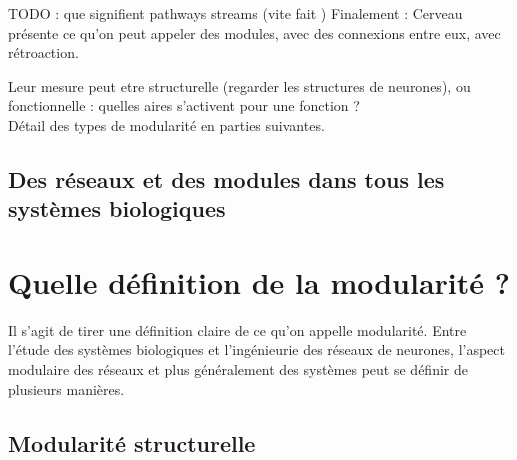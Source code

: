 
TODO : que signifient pathways streams (vite fait )
Finalement : 
Cerveau présente ce qu'on peut appeler des modules, avec des connexions entre eux, avec rétroaction. 

Leur mesure peut etre structurelle (regarder les structures de neurones), ou fonctionnelle : quelles aires s'activent pour une fonction ? \\
Détail des types de modularité en parties suivantes. 

\subsection{Des réseaux et des modules dans tous les systèmes biologiques}


\section{Quelle définition de la modularité ?}

Il s'agit de tirer une définition claire de ce qu'on appelle modularité. Entre l'étude des systèmes biologiques et l'ingénieurie des réseaux de neurones, l'aspect modulaire des réseaux et plus généralement des systèmes peut se définir de plusieurs manières. 

\subsection{Modularité structurelle}

